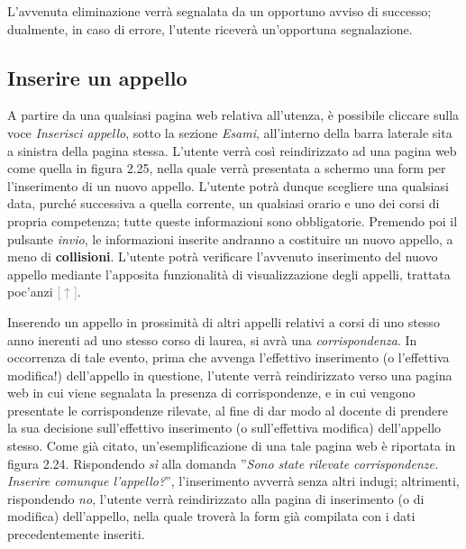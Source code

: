 \documentclass [a4paper,11pt]{book}
\begin{document}
L'avvenuta eliminazione verrà segnalata da un opportuno avviso di successo; dualmente, in caso di errore, l'utente riceverà un'opportuna segnalazione.

\medskip

\subsection{Inserire un appello}

A partire da una qualsiasi pagina web relativa all'utenza, è possibile cliccare sulla voce \emph{Inserisci appello}, sotto la sezione \emph{Esami}, all'interno della barra laterale sita a sinistra della pagina stessa. L'utente verrà così reindirizzato ad una pagina web come quella in figura 2.25, nella quale verrà presentata a schermo una form per l'inserimento di un nuovo appello. L'utente potrà dunque scegliere una qualsiasi data, purché successiva a quella corrente, un qualsiasi orario e uno dei corsi di propria competenza; tutte queste informazioni sono obbligatorie. Premendo poi il pulsante \emph{invio}, le informazioni inserite andranno a costituire un nuovo appello, a meno di \textbf{collisioni}. L'utente potrà verificare l'avvenuto inserimento del nuovo appello mediante l'apposita funzionalità di visualizzazione degli appelli, trattata poc'anzi \hyperref[sec:visualizzaAppelli]{\textcolor{gray}{[$\uparrow$]}}.


Inserendo un appello in prossimità di altri appelli relativi a corsi di uno stesso anno inerenti ad uno stesso corso di laurea, si avrà una \emph{corrispondenza}. In occorrenza di tale evento, prima che avvenga l'effettivo inserimento (o l'effettiva modifica!) dell'appello in questione, l'utente verrà reindirizzato verso una pagina web in cui viene segnalata la presenza di corrispondenze, e in cui vengono presentate le corrispondenze rilevate, al fine di dar modo al docente di prendere la sua decisione sull'effettivo inserimento (o sull'effettiva modifica) dell'appello stesso. Come già citato, un'esemplificazione di una tale pagina web è riportata in figura 2.24. Rispondendo \emph{sì} alla domanda ''\emph{Sono state rilevate corrispondenze. Inserire comunque l'appello?}'', l'inserimento avverrà senza altri indugi; altrimenti, rispondendo \emph{no}, l'utente verrà reindirizzato alla pagina di inserimento (o di modifica) dell'appello, nella quale troverà la form già compilata con i dati precedentemente inseriti.

\medskip
\end{document}
